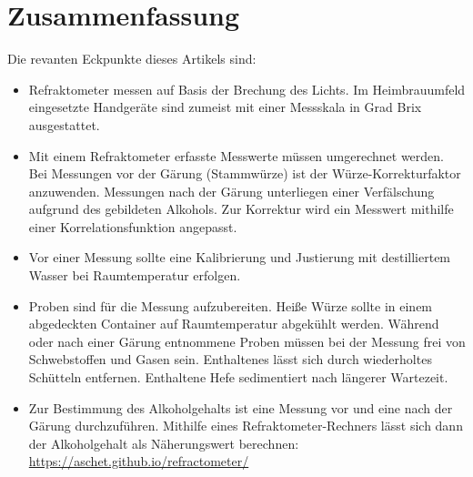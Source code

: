 \documentclass[a4paper,parskip=half]{scrartcl}
\begin{document}
\section*{Zusammenfassung}

Die revanten Eckpunkte dieses Artikels sind:

\begin{itemize}
\item Refraktometer messen auf Basis der Brechung des Lichts. Im
Heimbrauumfeld eingesetzte Handgeräte sind zumeist mit einer Messskala
in Grad Brix ausgestattet.
\item Mit einem Refraktometer erfasste Messwerte müssen umgerechnet
werden. Bei Messungen vor der Gärung (Stammwürze) ist der
Würze-Korrekturfaktor anzuwenden. Messungen nach
der Gärung unterliegen einer Verfälschung aufgrund des gebildeten
Alkohols. Zur Korrektur wird ein Messwert mithilfe einer
Korrelationsfunktion angepasst.
\item Vor einer Messung sollte eine Kalibrierung und Justierung
mit destilliertem Wasser bei Raumtemperatur erfolgen.
\item Proben sind für die Messung aufzubereiten. Heiße Würze
sollte in einem abgedeckten Container auf Raumtemperatur
abgekühlt werden. Während oder nach einer Gärung entnommene
Proben müssen bei der Messung frei von Schwebstoffen und Gasen sein.
Enthaltenes  lässt sich durch wiederholtes Schütteln
entfernen. Enthaltene Hefe sedimentiert nach längerer Wartezeit.
\item Zur Bestimmung des Alkoholgehalts ist eine Messung
vor und eine nach der Gärung durchzuführen. Mithilfe eines
Refraktometer-Rechners lässt sich dann der Alkoholgehalt
als Näherungswert berechnen: \url{https://aschet.github.io/refractometer/}

\end{itemize}

\printbibliography[title=Quellen]
\end{document}
